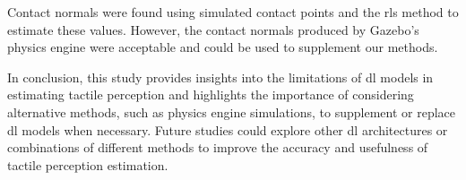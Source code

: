 Contact normals were found using simulated contact points and the \gls{rls} method to estimate these values. However, the contact normals produced by Gazebo's physics engine were acceptable and could be used to supplement our methods. \medskip

In conclusion, this study provides insights into the limitations of \gls{dl} models in estimating tactile perception and highlights the importance of considering alternative methods, such as physics engine simulations, to supplement or replace \gls{dl} models when necessary. Future studies could explore other \gls{dl} architectures or combinations of different methods to improve the accuracy and usefulness of tactile perception estimation.